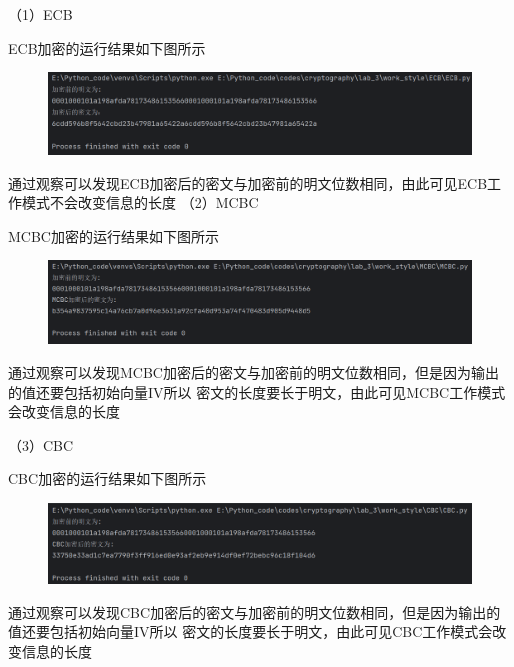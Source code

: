 \documentclass[a4paper,11pt,UTF8]{ctexart}
\newcommand{\bottomcaption}{%
\setlength{\abovecaptionskip}{6pt}%
\setlength{\belowcaptionskip}{6pt}%
\caption}
\newcommand{\xiaowuhao}{\fontsize{9pt}{\baselineskip}\selectfont}   %
\begin{document}
            （1）ECB\par
                ECB加密的运行结果如下图所示
                \begin{figure}[H]
                    \centering
                    \includegraphics[width=13cm]{ECB_result_4.png}
                    \bottomcaption{\xiaowuhao{ECB加密结果}}
                \end{figure}
                通过观察可以发现ECB加密后的密文与加密前的明文位数相同，由此可见ECB工作模式不会改变信息的长度
\newpage
            （2）MCBC\par
                MCBC加密的运行结果如下图所示
                \begin{figure}[H]
                    \centering
                    \includegraphics[width=13cm]{MCBC_result_4.png}
                    \bottomcaption{\xiaowuhao{MCBC加密结果}}
                \end{figure}
                通过观察可以发现MCBC加密后的密文与加密前的明文位数相同，但是因为输出的值还要包括初始向量IV所以
                密文的长度要长于明文，由此可见MCBC工作模式会改变信息的长度

            （3）CBC\par
                CBC加密的运行结果如下图所示
                \begin{figure}[H]
                    \centering
                    \includegraphics[width=13cm]{CBC_result_4.png}
                    \bottomcaption{\xiaowuhao{CBC加密结果}}
                \end{figure}
                通过观察可以发现CBC加密后的密文与加密前的明文位数相同，但是因为输出的值还要包括初始向量IV所以
                密文的长度要长于明文，由此可见CBC工作模式会改变信息的长度
\end{document}
